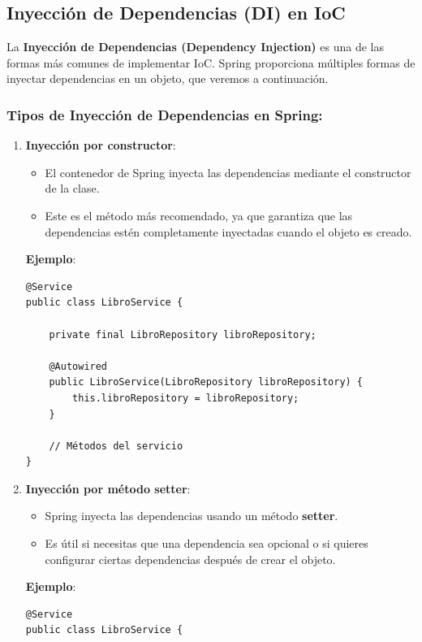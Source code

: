 \documentclass[11pt]{article}
\begin{document}
\subsection{Inyección de Dependencias (DI) en IoC}
\label{sec:orgbcbf204}
La \textbf{\textbf{Inyección de Dependencias (Dependency Injection)}} es una de las formas más comunes de implementar IoC. Spring proporciona múltiples formas de inyectar dependencias en un objeto, que veremos a continuación.

\subsubsection{Tipos de Inyección de Dependencias en Spring:}
\label{sec:org1fd9e32}
\begin{enumerate}
\item \textbf{\textbf{Inyección por constructor}}:
\begin{itemize}
\item El contenedor de Spring inyecta las dependencias mediante el constructor de la clase.
\item Este es el método más recomendado, ya que garantiza que las dependencias estén completamente inyectadas cuando el objeto es creado.
\end{itemize}

\textbf{\textbf{Ejemplo}}:
\begin{verbatim}
@Service
public class LibroService {

    private final LibroRepository libroRepository;

    @Autowired
    public LibroService(LibroRepository libroRepository) {
        this.libroRepository = libroRepository;
    }

    // Métodos del servicio
}
\end{verbatim}

\item \textbf{\textbf{Inyección por método setter}}:
\begin{itemize}
\item Spring inyecta las dependencias usando un método \textbf{\textbf{setter}}.
\item Es útil si necesitas que una dependencia sea opcional o si quieres configurar ciertas dependencias después de crear el objeto.
\end{itemize}

\textbf{\textbf{Ejemplo}}:
\begin{verbatim}
@Service
public class LibroService {


\end{verbatim}
\end{enumerate}
\end{document}
